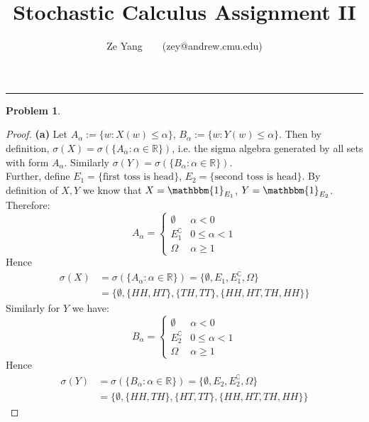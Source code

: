 \documentclass[a4paper, 10pt]{article}
\title{\textbf{Stochastic Calculus Assignment II}}
\author{Ze Yang~~~~(zey@andrew.cmu.edu)}
\theoremstyle{definition}
\newtheorem{problem}{Problem}
\theoremstyle{hSol}
\begin{document}
\maketitle



\noindent\rule{16cm}{0.4pt}
\begin{problem}
\end{problem}
\begin{proof} \textbf{(a)} Let $A_{\alpha}:=\{w: X(w)\leq \alpha\}$, $B_{\alpha}:=\{w: Y(w)\leq \alpha\}$. Then by definition, $\sigma(X) = \sigma(\{A_{\alpha}: \alpha \in \mathbb{R}\})$, i.e. the sigma algebra generated by all sets with form $A_{\alpha}$. Similarly $\sigma(Y) = \sigma(\{B_{\alpha}: \alpha \in \mathbb{R}\})$.\\
Further, define $E_1=\{\text{first toss is head}\}$, $E_2=\{\text{second toss is head}\}$. By definition of $X,Y$ we know that $X=\mathbbm{1}_{E_1}$, $Y=\mathbbm{1}_{E_2}$. Therefore:
\begin{equation}
	A_{\alpha} = \begin{cases}
	\emptyset & \alpha < 0\\
	E_1^{\complement} & 0\leq \alpha < 1\\
	\Omega & \alpha \geq 1
	\end{cases}
\end{equation}
Hence
\begin{equation}
	\begin{split}
		\sigma(X) &= \sigma(\{A_{\alpha}: \alpha \in \mathbb{R}\}) = \{\emptyset, E_1, E_1^{\complement}, \Omega\}\\
		&= \{\emptyset, \{HH,HT\}, \{TH, TT\}, \{HH,HT,TH,HH\}\}
	\end{split}
\end{equation}
Similarly for $Y$ we have:
\begin{equation}
	B_{\alpha} = \begin{cases}
	\emptyset & \alpha < 0\\
	E_2^{\complement} & 0\leq \alpha < 1\\
	\Omega & \alpha \geq 1
	\end{cases}
\end{equation}
Hence
\begin{equation}
	\begin{split}
		\sigma(Y) &= \sigma(\{B_{\alpha}: \alpha \in \mathbb{R}\}) = \{\emptyset, E_2, E_2^{\complement}, \Omega\}\\
		&= \{\emptyset, \{HH,TH\}, \{HT, TT\}, \{HH,HT,TH,HH\}\}

\end{split}
\end{equation}
\end{proof}
\end{document}
